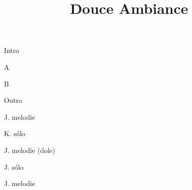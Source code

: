 \documentclass[timestamp]{jazzgrid}
\title{Douce Ambiance}
\begin{document}
\maketitle
\begin{musicsection}{Intro}
\barline
	{\barfour{}
		{}
		{}
		{}
		{}
	}
	{\barfour{}
		{}
		{}
		{}
		{}
	}
	{\barfour{}
		{}
		{}
		{}
		{}
	}
	{\barfour{}
		{}
		{}
		{}
		{}
	}
\barline
	{\barfour{}
		{}
		{}
		{}
		{}
	}
	{\barfour{}
		{}
		{}
		{}
		{}
	}
	{\barfour{}
		{}
		{}
		{}
		{}
	}
	{\barfour{}
		{}
		{}
		{}
		{}
	}
\end{musicsection}

\begin{musicsection}{A}
\barline
	{\barfour{}
		{}
		{}
		{}
		{}
	}
	{\barfour{}
		{}
		{}
		{}
		{}
	}
	{\barfour{}
		{}
		{}
		{}
		{}
	}
	{\barfour{}
		{}
		{}
		{}
		{}
	}
\barline
	{\barfour{}
		{}
		{}
		{}
		{}
	}
	{\barfour{}
		{}
		{}
		{}
		{}
	}
	{
		{}
		{}
		{}
		{}
	}
	{\barfour{}
		{}
		{}
		{}
		{}
	}
\barlinetwo{}
	{
		{}
		{}
		{}
		{}
	}
	{\barfour{}
		{}
		{}
		{}
		{}
	}
\end{musicsection}
\begin{musicsection}{B}
\barline
	{\barfour{}
		{}
		{}
		{}
		{}
	}
	{\barfour{}
		{}
		{}
		{}
		{}
	}
	{\barfour{}
		{}
		{}
		{}
		{}
	}
	{\barfour{}
		{}
		{}
		{}
		{}
	}
\barline
	{\barfour{}
		{}
		{}
		{}
		{}
	}
	{\barfour{}
		{}
		{}
		{}
		{}
	}
	{\barfour{}
		{}
		{}
		{}
		{}
	}
	{\barfour{}
		{}
		{}
		{}
		{}
	}
\end{musicsection}
\begin{musicsection}{Outro}
\barline
	{\barfour{}
		{}
		{}
		{}
		{}
	}
	{\barfour{}
		{}
		{}
		{}
		{}
	}
	{\barfour{}
		{}
		{}
		{}
		{}
	}
	{\barfour{}
		{}
		{}
		{}
		{}
	}
\barline
	{\barfour{}
		{}
		{}
		{}
		{}
	}
	{\barfour{}
		{}
		{}
		{}
		{}
	}
	{\barfour{}
		{}
		{}
		{}
		{}
	}
	{\barfour{}
		{}
		{}
		{}
		{}
	}
\end{musicsection}

\begin{multicols*}{2}
\begin{description}[noitemsep,align=right,labelwidth=\widthof{\scriptsize\bfseries{AABA}}]
	\scriptsize
	\item [Intro]
	\item [AABA] J. melodie
	\item [AA\phantom{BA}] K. sólo
	\item [BA] J. melodie (dole)
	\item [AABA] J. sólo
	\item [AABA] J. melodie
	\item [Outro]
\end{description}
\end{multicols*}
\end{document}
